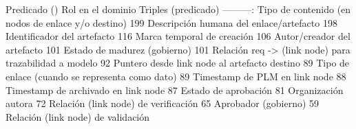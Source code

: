 {}\markdownRendererPipe{} Predicado () \markdownRendererPipe{} Rol en el dominio \markdownRendererPipe{} \markdownRendererBackslash{}\markdownRendererHash{}Triples (predicado) \markdownRendererPipe{} \markdownRendererPipe{}---\markdownRendererPipe{}---\markdownRendererPipe{}---:\markdownRendererPipe{} \markdownRendererPipe{}  \markdownRendererPipe{} Tipo de contenido (en nodos de enlace y/o destino) \markdownRendererPipe{} 199 \markdownRendererPipe{} \markdownRendererPipe{}  \markdownRendererPipe{} Descripción humana del enlace/artefacto \markdownRendererPipe{} 198 \markdownRendererPipe{} \markdownRendererPipe{}  \markdownRendererPipe{} Identificador del artefacto \markdownRendererPipe{} 116 \markdownRendererPipe{} \markdownRendererPipe{}  \markdownRendererPipe{} Marca temporal de creación \markdownRendererPipe{} 106 \markdownRendererPipe{} \markdownRendererPipe{}  \markdownRendererPipe{} Autor/creador del artefacto \markdownRendererPipe{} 101 \markdownRendererPipe{} \markdownRendererPipe{}  \markdownRendererPipe{} Estado de madurez (gobierno) \markdownRendererPipe{} 101 \markdownRendererPipe{} \markdownRendererPipe{}  \markdownRendererPipe{} Relación req -> (link node) para trazabilidad a modelo \markdownRendererPipe{} 92 \markdownRendererPipe{} \markdownRendererPipe{}  \markdownRendererPipe{} Puntero desde link node al artefacto destino \markdownRendererPipe{} 89 \markdownRendererPipe{} \markdownRendererPipe{}  \markdownRendererPipe{} Tipo de enlace (cuando se representa como dato) \markdownRendererPipe{} 89 \markdownRendererPipe{} \markdownRendererPipe{}  \markdownRendererPipe{} Timestamp de PLM en link node \markdownRendererPipe{} 88 \markdownRendererPipe{} \markdownRendererPipe{}  \markdownRendererPipe{} Timestamp de archivado en link node \markdownRendererPipe{} 87 \markdownRendererPipe{} \markdownRendererPipe{}  \markdownRendererPipe{} Estado de aprobación \markdownRendererPipe{} 81 \markdownRendererPipe{} \markdownRendererPipe{}  \markdownRendererPipe{} Organización autora \markdownRendererPipe{} 72 \markdownRendererPipe{} \markdownRendererPipe{}  \markdownRendererPipe{} Relación (link node) de verificación \markdownRendererPipe{} 65 \markdownRendererPipe{} \markdownRendererPipe{}  \markdownRendererPipe{} Aprobador (gobierno) \markdownRendererPipe{} 59 \markdownRendererPipe{} \markdownRendererPipe{}  \markdownRendererPipe{} Relación (link node) de validación 